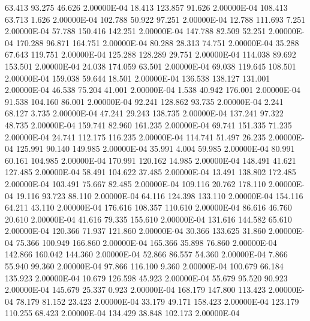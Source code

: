    63.413    93.275    46.626  2.00000E-04
    18.413   123.857    91.626  2.00000E-04
   108.413    63.713     1.626  2.00000E-04
   102.788    50.922    97.251  2.00000E-04
    12.788   111.693     7.251  2.00000E-04
    57.788   150.416   142.251  2.00000E-04
   147.788    82.509    52.251  2.00000E-04
   170.288    96.871   164.751  2.00000E-04
    80.288    28.313    74.751  2.00000E-04
    35.288    67.643   119.751  2.00000E-04
   125.288   128.289    29.751  2.00000E-04
   114.038    89.692   153.501  2.00000E-04
    24.038   174.059    63.501  2.00000E-04
    69.038   119.645   108.501  2.00000E-04
   159.038    59.644    18.501  2.00000E-04
   136.538   138.127   131.001  2.00000E-04
    46.538    75.204    41.001  2.00000E-04
     1.538    40.942   176.001  2.00000E-04
    91.538   104.160    86.001  2.00000E-04
    92.241   128.862    93.735  2.00000E-04
     2.241    68.127     3.735  2.00000E-04
    47.241    29.243   138.735  2.00000E-04
   137.241    97.322    48.735  2.00000E-04
   159.741    82.960   161.235  2.00000E-04
    69.741   151.335    71.235  2.00000E-04
    24.741   112.175   116.235  2.00000E-04
   114.741    51.497    26.235  2.00000E-04
   125.991    90.140   149.985  2.00000E-04
    35.991     4.004    59.985  2.00000E-04
    80.991    60.161   104.985  2.00000E-04
   170.991   120.162    14.985  2.00000E-04
   148.491    41.621   127.485  2.00000E-04
    58.491   104.622    37.485  2.00000E-04
    13.491   138.802   172.485  2.00000E-04
   103.491    75.667    82.485  2.00000E-04
   109.116    20.762   178.110  2.00000E-04
    19.116    93.723    88.110  2.00000E-04
    64.116   124.398   133.110  2.00000E-04
   154.116    64.211    43.110  2.00000E-04
   176.616   108.357   110.610  2.00000E-04
    86.616    46.760    20.610  2.00000E-04
    41.616    79.335   155.610  2.00000E-04
   131.616   144.582    65.610  2.00000E-04
   120.366    71.937   121.860  2.00000E-04
    30.366   133.625    31.860  2.00000E-04
    75.366   100.949   166.860  2.00000E-04
   165.366    35.898    76.860  2.00000E-04
   142.866   160.042   144.360  2.00000E-04
    52.866    86.557    54.360  2.00000E-04
     7.866    55.940    99.360  2.00000E-04
    97.866   116.100     9.360  2.00000E-04
   100.679    66.184   135.923  2.00000E-04
    10.679   126.598    45.923  2.00000E-04
    55.679    95.520    90.923  2.00000E-04
   145.679    25.337     0.923  2.00000E-04
   168.179   147.800   113.423  2.00000E-04
    78.179    81.152    23.423  2.00000E-04
    33.179    49.171   158.423  2.00000E-04
   123.179   110.255    68.423  2.00000E-04
   134.429    38.848   102.173  2.00000E-04
